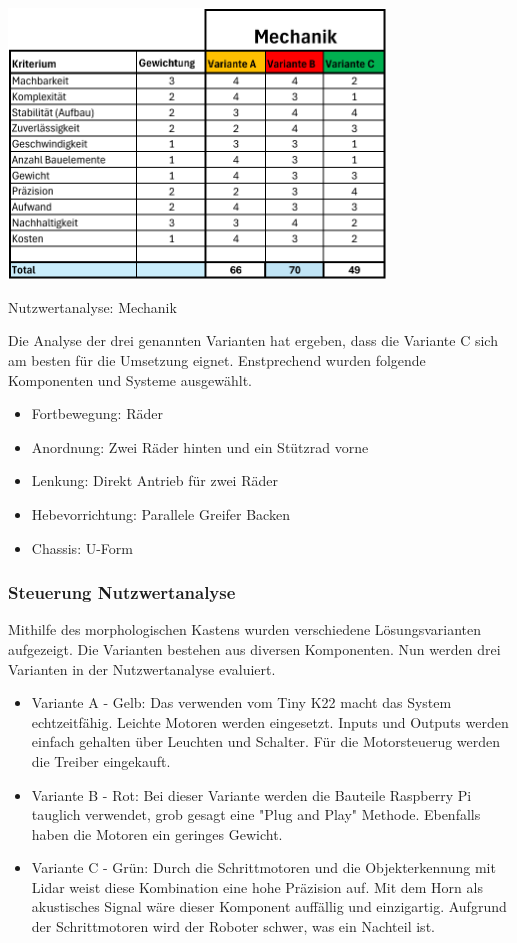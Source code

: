\begin{table}[H]
\centering
\includegraphics[width=0.75\textwidth]{assets/Nutzwertanalyse-M.pdf}
\caption{Nutzwertanalyse: Mechanik}
\label{table:nutzwert-maschinentechnik}
\end{table}

Die Analyse der drei genannten Varianten hat ergeben, dass die Variante C sich am besten für die Umsetzung eignet. Enstprechend wurden folgende Komponenten und Systeme ausgewählt. 

\begin{itemize}
    \item Fortbewegung: Räder 
    \item Anordnung:  Zwei Räder hinten und ein Stützrad vorne
    \item Lenkung: Direkt Antrieb für zwei Räder
    \item Hebevorrichtung: Parallele Greifer Backen
    \item Chassis: U-Form 
\end{itemize}

\subsubsection{Steuerung Nutzwertanalyse}

Mithilfe des morphologischen Kastens wurden verschiedene Lösungsvarianten aufgezeigt. Die Varianten bestehen aus diversen Komponenten. 
Nun werden drei Varianten in der Nutzwertanalyse evaluiert.

\begin{itemize}
    \item Variante A - Gelb: Das verwenden vom Tiny K22 macht das System echtzeitfähig. Leichte Motoren werden eingesetzt. Inputs und Outputs werden einfach gehalten über Leuchten und Schalter. Für die Motorsteuerug werden die Treiber eingekauft.
    \item Variante B - Rot: Bei dieser Variante werden die Bauteile Raspberry Pi tauglich verwendet, grob gesagt eine "Plug and Play" Methode. Ebenfalls haben die Motoren ein geringes Gewicht.
    \item Variante C - Grün: Durch die Schrittmotoren und die Objekterkennung mit Lidar weist diese Kombination eine hohe Präzision auf. Mit dem Horn als akustisches Signal wäre dieser Komponent auffällig und einzigartig. Aufgrund der Schrittmotoren wird der Roboter schwer, was ein Nachteil ist.
\end{itemize}

